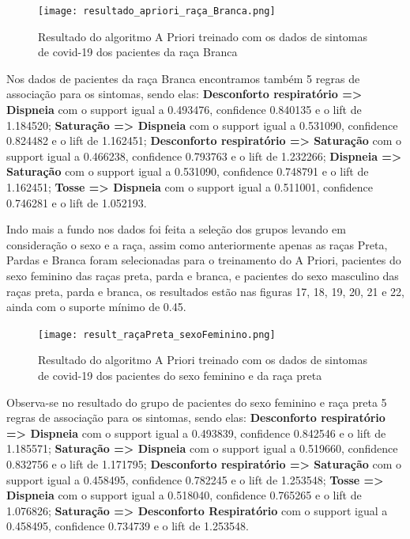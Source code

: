 \documentclass[tcc1]{uftex}
\begin{document}
\begin{itemize}
    \begin{figure}[!h]
    \centering
    \texttt{[image: resultado\_apriori\_raça\_Branca.png]} %
    \caption{Resultado do algoritmo A Priori treinado com os dados de sintomas de covid-19 dos pacientes da raça Branca}
    \end{figure}
    
    Nos dados de pacientes da raça Branca encontramos também 5 regras de associação para os sintomas, sendo elas: 
    \textbf{Desconforto respiratório => Dispneia} com o support igual a 0.493476, confidence 0.840135 e o lift de 1.184520;
    \textbf{Saturação => Dispneia} com o support igual a 0.531090, confidence 0.824482 e o lift de 1.162451; 
    \textbf{Desconforto respiratório => Saturação} com o support igual a 0.466238, confidence 0.793763 e o lift de 1.232266;
    \textbf{Dispneia => Saturação} com o support igual a 0.531090, confidence 0.748791 e o lift de 1.162451;
    \textbf{Tosse => Dispneia} com o support igual a 0.511001, confidence 0.746281 e o lift de 1.052193.
    
    Indo mais a fundo nos dados foi feita a seleção dos grupos levando em consideração o sexo e a raça, assim como anteriormente apenas as raças Preta, Pardas e Branca foram selecionadas para o treinamento do A Priori, pacientes do sexo feminino das raças preta, parda e branca, e pacientes do sexo masculino das raças preta, parda e branca,  os resultados estão nas figuras 17, 18, 19, 20, 21 e 22, ainda com o suporte mínimo de 0.45.
    
    \begin{figure}[!h]
    \centering
    \texttt{[image: result\_raçaPreta\_sexoFeminino.png]} %
    \caption{Resultado do algoritmo A Priori treinado com os dados de sintomas de covid-19 dos pacientes do sexo feminino e da raça preta}
    \end{figure}
    
    Observa-se no resultado do grupo de pacientes do sexo feminino e raça preta 5 regras de associação para os sintomas, sendo elas: 
    \textbf{Desconforto respiratório => Dispneia} com o support igual a 0.493839, confidence 0.842546 e o lift de 1.185571;
    \textbf{Saturação => Dispneia} com o support igual a 0.519660, confidence 0.832756 e o lift de 1.171795; 
    \textbf{Desconforto respiratório => Saturação} com o support igual a 0.458495, confidence 0.782245 e o lift de 1.253548;
    \textbf{Tosse => Dispneia} com o support igual a 0.518040, confidence 0.765265 e o lift de 1.076826;
    \textbf{Saturação => Desconforto Respiratório} com o support igual a 0.458495, confidence 0.734739 e o lift de 1.253548.
    

\end{itemize}
\end{document}
